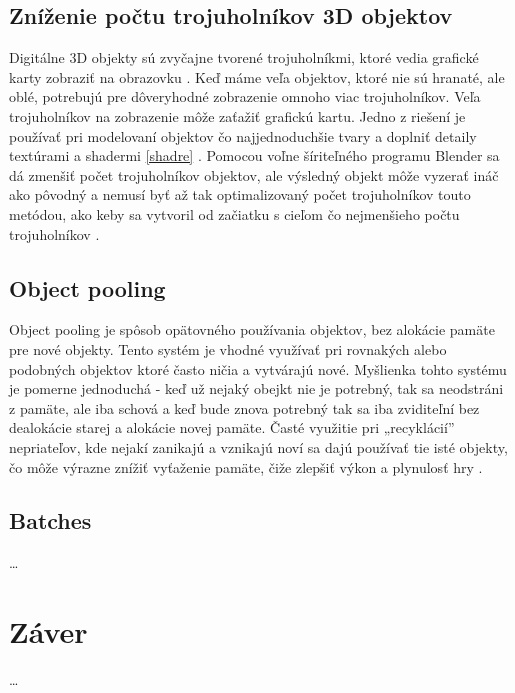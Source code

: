 \documentclass[10pt,twoside,slovak,a4paper]{article}
\begin{document}
\subsection{Zníženie počtu trojuholníkov 3D objektov}
Digitálne 3D objekty sú zvyčajne tvorené trojuholníkmi, ktoré vedia grafické karty zobraziť na obrazovku \cite{polygons}. Keď máme veľa objektov, ktoré nie sú hranaté, ale oblé, potrebujú pre dôveryhodné zobrazenie omnoho viac trojuholníkov. Veľa trojuholníkov na zobrazenie môže zaťažiť grafickú kartu. Jedno z riešení je používať pri modelovaní objektov čo najjednoduchšie tvary a doplniť detaily textúrami a shadermi \ref{shadre} \cite{Koulaxidis-BOT}. Pomocou voľne šíriteľného programu Blender \cite{Blender} sa dá zmenšiť počet trojuholníkov objektov, ale výsledný objekt môže vyzerať ináč ako pôvodný a nemusí byť až tak optimalizovaný počet trojuholníkov touto metódou, ako keby sa vytvoril od začiatku s cieľom čo nejmenšieho počtu trojuholníkov \cite{Koulaxidis-BOT}. 



\subsection{Object pooling}
Object pooling je spôsob opätovného používania objektov, bez alokácie pamäte pre nové objekty. Tento systém je vhodné využívať pri rovnakých alebo podobných objektov ktoré často ničia a vytvárajú nové. Myšlienka tohto systému je pomerne jednoduchá - keď už nejaký obejkt nie je potrebný, tak sa neodstráni z pamäte, ale iba schová a keď bude znova potrebný tak sa iba zviditeľní bez dealokácie starej a alokácie novej pamäte. Časté využitie pri „recyklácií” nepriateľov, kde nejakí zanikajú a vznikajú noví sa dajú používať tie isté objekty, čo môže výrazne znížiť vyťaženie pamäte, čiže zlepšiť výkon a plynulosť hry \cite{AversaAndDickinson:UGO}.

\subsection{Batches}
\ldots

\section{Záver}
\ldots





\end{document}
